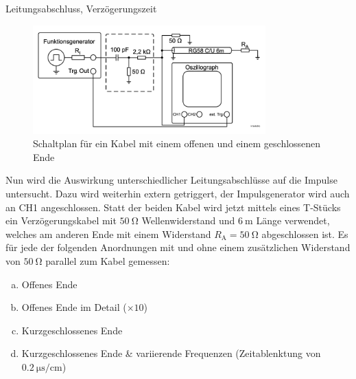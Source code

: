 \documentclass[ngerman]{scrartcl}
\theoremstyle{definition}
\begin{document}
		\begin{aufgabe}{Leitungsabschluss, Verzögerungszeit}
			\begin{figure}[h!]
				\centering
				\includegraphics[width=0.8\textwidth]{figs/Aufbau_1_3_Leitungsabschluss.png}
				\caption{Schaltplan für ein Kabel mit einem offenen und einem geschlossenen Ende~\cite{anleitung}}
				\label{fig:aufbau_1_3_leitungsabschluss}
			\end{figure}
			Nun wird die Auswirkung unterschiedlicher Leitungsabschlüsse auf die Impulse untersucht. Dazu wird weiterhin extern getriggert, der Impulsgenerator wird auch an CH1 angeschlossen. Statt der beiden Kabel wird jetzt mittels eines T-Stücks ein Verzögerungskabel mit $\SI{50}{\ohm}$ Wellenwiderstand und $\SI{6}{\meter}$ Länge verwendet, welches am anderen Ende mit einem Widerstand $R_\mathrm{A} = \SI{50}{\ohm}$ abgeschlossen ist. Es für jede der folgenden Anordnungen mit und ohne einem zusätzlichen Widerstand von $\SI{50}{\ohm}$ parallel zum Kabel gemessen:
			\begin{enumerate}[(a)]
				\item Offenes Ende
				\item Offenes Ende im Detail ($\times 10$)
				\item Kurzgeschlossenes Ende
				\item Kurzgeschlossenes Ende \& variierende Frequenzen (Zeitablenktung von $\SI{0.2}{\micro\second\per\centi\meter}$)
			\end{enumerate}
		\end{aufgabe}
\end{document}
